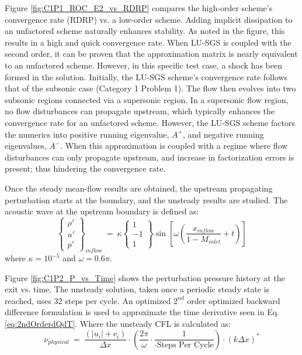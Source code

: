 \documentclass[conf]{new-aiaa}
\begin{document}
Figure \ref{fig:C1P1_ROC_E2_vs_RDRP} compares the high-order scheme's convergence rate (RDRP) vs. a low-order scheme. 
Adding implicit dissipation to an unfactored scheme naturally enhances stability. 
As noted in the figure, this results in a high and quick convergence rate. 
When LU-SGS is coupled with the second order, it can be proven that the approximation matrix is nearly equivalent to an unfactored scheme. 
However, in this specific test case, a shock has been formed in the solution. 
Initially, the LU-SGS scheme's convergence rate follows that of the subsonic case (Category 1 Problem 1). 
The flow then evolves into two subsonic regions connected via a supersonic region. 
In a supersonic flow region, no flow disturbances can propagate upstream, which typically enhances the convergence rate for an unfactored scheme.
However, the LU-SGS scheme factors the numerics into positive running eigenvalue, $A^+$, and negative running eigenvalues, $A^-$. 
When this approximation is coupled with a regime where flow disturbances can only propagate upstream, and increase in factorization errors is present; thus hindering the convergence rate. 

Once the steady mean-flow results are obtained, the upstream propagating perturbation starts at the boundary, and the unsteady results are studied.  
The acoustic wave at the upstream boundary is defined as:
\begin{equation*}
	\left\{
	\begin{matrix}
		{\rho}' \\
		{u}' \\
		{p}'
	\end{matrix}
	\right\}_{inflow}~=~
\kappa
	\left\{
	\begin{matrix}
		1 \\
		-1 \\
		1
	\end{matrix}
	\right\}\sin\left[\omega\left(\frac{x_{inflow}}{1-M_{inlet}}+t\right)\right]
\end{equation*}
where $\kappa=10^{-5}$ and $\omega=0.6\pi$. 

Figure \ref{fig:C1P2_P_vs_Time} shows the perturbation pressure history at the exit vs. time. 
The unsteady solution, taken once a periodic steady state is reached, uses 32 steps per cycle. An optimized $2^{nd}$ order optimized backward difference formulation \cite{HixonImplicit} is used to approximate the time derivative seen in Eq. \eqref{eq:2ndOrderdQdT}. 
Where the unsteady CFL is calculated as:
\begin{equation*}
	\nu_{physical}
  			~=~\frac{\left(\left|u_i\right|+c_i\right)}{\Delta{x}}\cdot\left(\frac{2\pi}{\omega}\cdot\frac{1}{\cdot \text{Steps~Per~Cycle}}\right)\cdot\left(k\Delta{x}\right)^*
\end{equation*}
\end{document}
